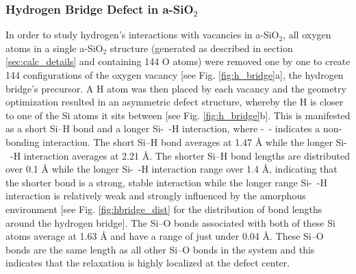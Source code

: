 \documentclass[aps,prb,reprint,superscriptaddress,showpacs]{revtex4-1}
\begin{document}
\subsubsection{Hydrogen Bridge Defect in a-SiO$_2$}

In order to study hydrogen's interactions with vacancies in a-SiO$_2$, all oxygen atoms in a single a-SiO$_2$ structure (generated as described in section \ref{sec:calc_details} and containing 144 O atoms) were removed one by one to create 144 configurations of the oxygen vacancy [see Fig. \ref{fig:h_bridge}a], the hydrogen bridge's precursor. A H atom was then placed by each vacancy and the geometry optimization resulted in an asymmetric defect structure, whereby the H is closer to one of the Si atoms it sits between [see Fig. \ref{fig:h_bridge}b]. This is manifested as a short \mbox{Si--H} bond and a longer \mbox{Si- -H} interaction, where \mbox{-  -} indicates a non-bonding interaction. The short \mbox{Si--H} bond averages at 1.47 {\AA} while the longer \mbox{Si-  -H} interaction averages at 2.21 {\AA}. The shorter \mbox{Si--H} bond lengths are distributed over 0.1 {\AA} while the longer \mbox{Si- -H} interaction range over 1.4 {\AA}, indicating that the shorter bond is a strong, stable interaction while the longer range \mbox{Si- -H} interaction is relatively weak and strongly influenced by the amorphous environment [see Fig. \ref{fig:hbridge_dist} for the distribution of bond lengths around the hydrogen bridge]. The \mbox{Si--O} bonds associated with both of these Si atoms average at 1.63 {\AA} and have a range of just under 0.04 {\AA}. These \mbox{Si--O} bonds are the same length as all other \mbox{Si--O} bonds in the system and this indicates that the relaxation is highly localized at the defect center. 
\end{document}
